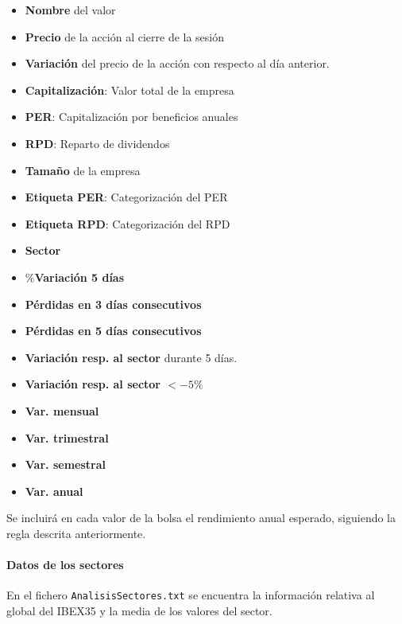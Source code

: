 \documentclass[11pt,leqno]{article}
\theoremstyle{definition_wo_parentheses}
\theoremstyle{plain}
\theoremstyle{remark}
\begin{document}
	\begin{itemize}
		\item \textbf{Nombre} del valor
		\item \textbf{Precio} de la acción al cierre de la sesión
		\item \textbf{Variación} del precio de la acción con respecto al día anterior.
		\item \textbf{Capitalización}: Valor total de la empresa
		\item \textbf{PER}: Capitalización por beneficios anuales
		\item \textbf{RPD}: Reparto de dividendos
		\item \textbf{Tamaño} de la empresa
		\item \textbf{Etiqueta PER}: Categorización del PER
		\item \textbf{Etiqueta RPD}: Categorización del RPD
		\item \textbf{Sector}
		\item $\mathbf{\%}$\textbf{Variación 5 días}
		\item \textbf{Pérdidas en 3 días consecutivos}
		\item \textbf{Pérdidas en 5 días consecutivos}
		\item \textbf{Variación resp. al sector} durante 5 días.
		\item \textbf{Variación resp. al sector $<-5\%$}
		\item \textbf{Var. mensual}
		\item \textbf{Var. trimestral}
		\item \textbf{Var. semestral}
		\item \textbf{Var. anual}
	\end{itemize}
	
	Se incluirá en cada valor de la bolsa el rendimiento anual esperado, siguiendo la regla descrita anteriormente.
	
	
	\paragraph{Datos de los sectores} En el fichero \texttt{AnalisisSectores.txt} se encuentra la información relativa al global del IBEX35 y la media de los valores del sector.
	
\end{document}
